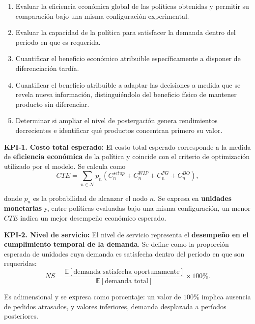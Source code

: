 \begin{enumerate}[label=\textbf{KPI-\arabic*.}, leftmargin=*, itemsep=2pt]
    \item Evaluar la eficiencia económica global de las políticas obtenidas y permitir su comparación bajo una misma configuración experimental.
    \item Evaluar la capacidad de la política para satisfacer la demanda dentro del período en que es requerida.
    \item Cuantificar el beneficio económico atribuible específicamente a disponer de diferenciación tardía.
    \item Cuantificar el beneficio atribuible a adaptar las decisiones a medida que se revela nueva información, distinguiéndolo del beneficio físico de mantener producto sin diferenciar.
    \item Determinar si ampliar el nivel de postergación genera rendimientos decrecientes e identificar qué productos concentran primero su valor.
\end{enumerate}

\medskip
\noindent\textbf{KPI-1. Costo total esperado: }El costo total esperado corresponde a la medida de \textbf{eficiencia económica} de la política y coincide con el criterio de optimización utilizado por el modelo. Se calcula como
\begin{equation}
    CTE =
    \sum_{n\in\mathcal{N}}p_n
    \left(
        C^{setup}_n+
        C^{WIP}_n+
        C^{FG}_n+
        C^{BO}_n
    \right),
\end{equation}

donde $p_n$ es la probabilidad de alcanzar el nodo $n$. Se expresa en \textbf{unidades monetarias} y, entre políticas evaluadas bajo una misma configuración, un menor $CTE$ indica un mejor desempeño económico esperado.

\medskip
\noindent\textbf{KPI-2. Nivel de servicio: }El nivel de servicio representa el \textbf{desempeño en el cumplimiento temporal de la demanda}. Se define como la proporción esperada de unidades cuya demanda es satisfecha dentro del período en que son requeridas:
\begin{equation}
    NS =
    \frac{
        \mathbb{E}[\text{demanda satisfecha oportunamente}]
    }{
        \mathbb{E}[\text{demanda total}]
    }
    \times100\%.
\end{equation}

Es adimensional y se expresa como porcentaje: un valor de $100\%$ implica ausencia de pedidos atrasados, y valores inferiores, demanda desplazada a períodos posteriores.

